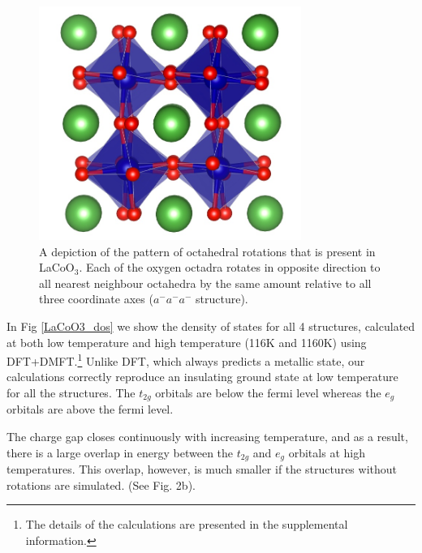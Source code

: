 \documentclass[10pt]{ruthesis}
\begin{document}
{\begin{figure}
 \begin{center}
 \includegraphics[height=3in]{plots_final/supplement_plots/a-a-a-_struct}
 \caption{A depiction of the pattern of octahedral rotations that is present in LaCoO$_3$. Each of the oxygen octadra rotates in opposite direction to all nearest neighbour octahedra by the same amount relative to all three coordinate axes ($a^-a^-a^-$ structure).}\label{Sfig:structure}
 \end{center}
 \end{figure}

In Fig \ref{LaCoO3_dos} we show the density of states for all 4 structures, calculated at both low temperature and high temperature (116K and 1160K) using DFT+DMFT.\footnote{The details of the calculations are presented in the supplemental information.}  Unlike DFT, which always predicts a metallic state, our calculations correctly reproduce an insulating ground state at low temperature for all the structures. The $t_{2g}$ orbitals are below the fermi level whereas the $e_g$ orbitals are above the fermi level. 

The charge gap closes continuously with increasing temperature, and as a result, there is a large overlap in energy between the $t_{2g}$ and $e_g$ orbitals at high temperatures. This overlap, however, is much smaller if the structures without rotations are simulated. (See Fig. 2b).

}
\end{document}
